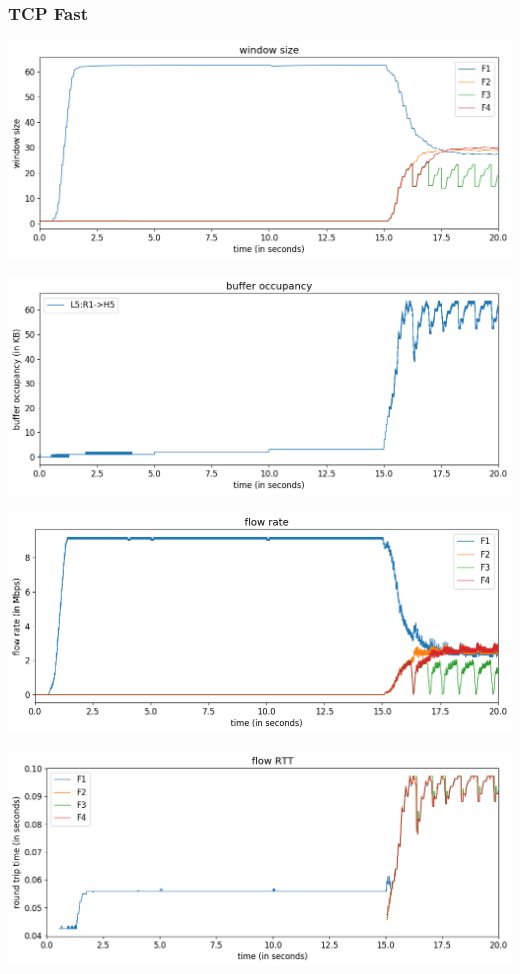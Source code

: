 \documentclass{article}
\begin{document}
\subsubsection{TCP Fast}

\includegraphics[width = \textwidth]{"test_case5_fast window size"}

\includegraphics[width = \textwidth]{"test_case5_fast buffer occupancy"}

\includegraphics[width = \textwidth]{"test_case5_fast flow rate"}

\includegraphics[width = \textwidth]{"test_case5_fast flow RTT"}
\end{document}
